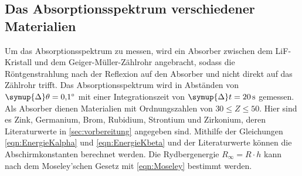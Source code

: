 \subsection{Das Absorptionsspektrum verschiedener Materialien}

    Um das Absorptionsspektrum zu messen,
    wird ein Absorber zwischen dem LiF-Kristall und dem Geiger-Müller-Zählrohr angebracht,
    sodass die Röntgenstrahlung nach der Reflexion auf den Absorber und nicht direkt auf das Zählrohr trifft.
    Das Absorptionsspektrum wird in Abständen von $\symup{\Delta}\theta = \SI{0.1}{\degree}$ mit einer Integrationszeit von $\symup{\Delta}t = \SI{20}{\second}$ gemessen.
    Als Absorber dienen Materialien mit Ordnungszahlen von $30 \leq Z \leq 50$.
    Hier sind es Zink, Germanium, Brom, Rubidium, Strontium und Zirkonium,
    deren Literaturwerte in \autoref{sec:vorbereitung} angegeben sind.
    Mithilfe der Gleichungen \eqref{eqn:EnergieKalpha} und \eqref{eqn:EnergieKbeta} und der Literaturwerte können die Abschirmkonstanten berechnet werden.
    Die Rydbergenergie $R_\infty = R \cdot h$ kann nach dem Moseley'schen Gesetz mit \autoref{eqn:Moseley} bestimmt werden.
